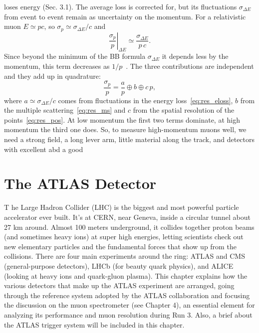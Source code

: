 \documentclass[11pt,a4paper,twoside,openright]{report}
\begin{document}
loses energy (Sec. 3.1). The average loss is
corrected for, but its fluctuations $\sigma_{\Delta E}$ from event to event remain as uncertainty on the momentum. For a relativistic muon
$E \simeq pc$, so $\sigma_p \simeq \sigma_{\Delta E}/c$ and
\begin{equation}
  \left.\frac{\sigma_p}{p}\right|_{\Delta E}
  \simeq \frac{\sigma_{\Delta E}}{p\,c} .
  \label{eq:res_eloss}
\end{equation}
Since beyond the minimum of the BB formula $\sigma_{\Delta E}$ it depends less by the momentum, this term decreases as
$1/p$~\cite{ATLAS-MCP-2023}. The three contributions are independent and they add up in quadrature:
\begin{equation}
  \frac{\sigma_p}{p} = \frac{a}{p} \oplus b \oplus c\,p ,
  \label{eq:res_tot}
\end{equation}
where $a \simeq \sigma_{\Delta E}/c$ comes from fluctuations in the
energy loss~\eqref{eq:res_eloss}, $b$ from the multiple
scattering~\eqref{eq:res_ms} and $c$ from the spatial resolution of the
points~\eqref{eq:res_pos}. At low momentum the first two terms dominate, at high momentum the third one does. So, to measure high-momentum muons well, we need a strong field, a long lever arm, little material along the track, and detectors with excellent abd a good 

\chapter{The ATLAS Detector}

\lettrine[lines=3,loversize=0.1,lraise=0.05]{T}{} he Large Hadron Collider (LHC) is the biggest and most powerful particle accelerator ever built. It’s at CERN, near Geneva, inside a circular tunnel about 27 km around. Almost 100 meters underground, it collides together proton beams (and sometimes heavy ions) at super high energies, letting scientists check out new elementary particles and the fundamental forces that show up from the collisions. There are four main experiments around the ring: ATLAS and CMS (general-purpose detectors), LHCb (for beauty quark physics), and ALICE (looking at heavy ions and quark-gluon plasma). This chapter explains how the various detectors that make up the ATLAS experiment are arranged, going through the reference system adopted by the ATLAS collaboration and focusing the discussion on the muon spectrometer (see Chapter 4), an essential element for analyzing its performance and muon resolution during Run 3. Also, a brief about the ATLAS trigger system will be included in this chapter. 
\end{document}
